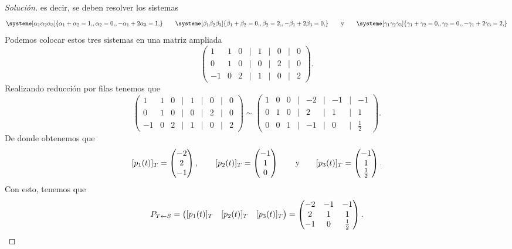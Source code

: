 \documentclass[a4,11pt]{aleph-notas}
\begin{document}
\begin{proof}[Solución]
    es decir, se deben resolver los sistemas
    \[
        \systeme[\alpha_1\alpha_2\alpha_3]{
        \alpha_1 + \alpha_2 = 1{,},
        \alpha_2 = 0{,},
        -\alpha_1+2\alpha_3 = 1{,}
        }
        \qquad
        \systeme[\beta_1\beta_2\beta_3]{
        \beta_1 + \beta_2 = 0{,},
        \beta_2 = 2{,},
        -\beta_1+2\beta_3 = 0{,}
        }
        \texty
        \systeme[\gamma_1\gamma_2\gamma_3]{
        \gamma_1 + \gamma_2 = 0{,},
        \gamma_2 = 0{,},
        -\gamma_1+2\gamma_3 = 2{,}
        }
    \]
    Podemos colocar estos tres sistemas en una matriz ampliada
    \[
        \begin{pmatrix}
             1 & 1 & 0 & | & 1 & | & 0 & | & 0\\
             0 & 1 & 0 & | & 0 & | & 2 & | & 0\\
            -1 & 0 & 2 & | & 1 & | & 0 & | & 2
        \end{pmatrix}.
    \]
    Realizando reducción por filas tenemos que
    \[
        \begin{pmatrix}
             1 & 1 & 0 & | & 1 & | & 0 & | & 0\\
             0 & 1 & 0 & | & 0 & | & 2 & | & 0\\
            -1 & 0 & 2 & | & 1 & | & 0 & | & 2
        \end{pmatrix}
        \sim
        \begin{pmatrix}
            1 & 0 & 0 & | & -2 & | & -1 & | & -1\\
            0 & 1 & 0 & | &  2 & | &  1 & | & 1\\
            0 & 0 & 1 & | & -1 & | &  0 & | & \frac 1 2
        \end{pmatrix}.
    \]
    De donde obtenemos que
    \[
        [p_1(t)]_T
        = \begin{pmatrix}
            -2\\2\\-1
        \end{pmatrix},
        \qquad
        [p_2(t)]_T
        = \begin{pmatrix}
            -1\\1\\0
        \end{pmatrix}
        \qquad\text{y}\qquad
        [p_3(t)]_T
        = \begin{pmatrix}
            -1\\1\\\frac 1 2
        \end{pmatrix}.
    \]
    Con esto, tenemos que
    \[
        P_{T\leftarrow S} = 
        \begin{pmatrix}
        [p_1(t)]_T & [p_2(t)]_T & [p_3(t)]_T
        \end{pmatrix}
        =
        \begin{pmatrix}
             -2 & -1 &  -1\\
              2 &  1 &  1\\
             -1 &  0 &  \frac 1 2
        \end{pmatrix}.
        \qedhere
    \]
\end{proof}
\end{document}
